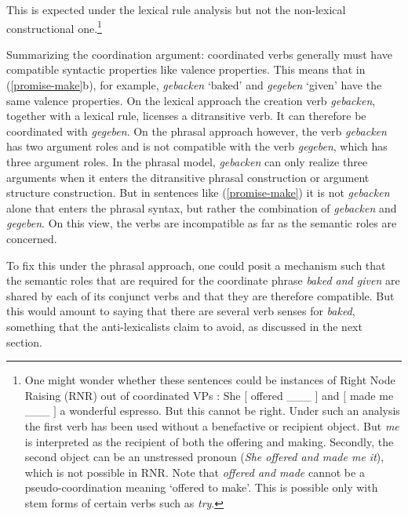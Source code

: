 \noindent
This is expected under the lexical rule analysis but not the non-lexical constructional one.\footnote{
One might wonder whether these sentences could be instances of Right Node Raising (RNR) out of coordinated VPs \citep{Bresnan74a-u, Abbott76a-u}:  
\ea \label{rnr}
She $[$ offered  \_\_\_  $]$ and $[$ made me \_\_\_ $]$  a wonderful espresso. 
\z
But this cannot be right.  
Under such an analysis the first verb has been used without a
benefactive or recipient object.  But \emph{me} is interpreted as the recipient of both the offering and making.
Secondly, the second object can be an unstressed pronoun (\emph{She offered and made me it}), which is not possible in RNR.  Note that \emph{offered and made} cannot be a pseudo-coordination meaning `offered to make'.  This is possible only with stem forms of certain verbs such as \emph{try}.}  

Summarizing the coordination argument:  coordinated verbs generally must have compatible syntactic properties like valence properties.  This means that in (\ref{promise-make}b), for example,
\emph{gebacken} `baked' and \emph{gegeben} `given' have the same valence properties. 
On the lexical approach the creation verb
\emph{gebacken}, together with a lexical rule, licenses a ditransitive verb.  It can therefore be coordinated with \emph{gegeben}. On the phrasal
approach however, the verb \emph{gebacken} has two argument roles and is not compatible with the verb
\emph{gegeben}, which has three argument roles. In the phrasal model, \emph{gebacken} can only realize three arguments when it
enters the ditransitive phrasal construction or argument structure construction.  But in sentences like (\ref{promise-make}) it is not
\emph{gebacken} alone that enters the phrasal syntax, but rather the combination of \emph{gebacken} and
\emph{gegeben}. On this view, the verbs are incompatible as far as the semantic roles are concerned. 

To fix this under the phrasal approach, one could posit a mechanism such that the semantic roles that are required for the coordinate phrase \emph{baked and
  given} %
  are shared by each of its conjunct verbs and that they are therefore compatible.  But this would
  amount to saying that there are several verb senses for \emph{baked}, something that the
  anti-lexicalists claim to avoid, as discussed in the next section.

